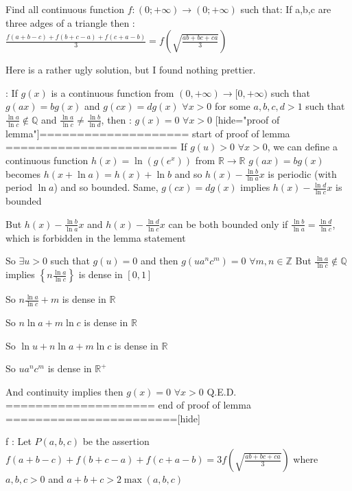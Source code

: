 \begin{solution}
	\begin{tcolorbox}Find all continuous function $f : (0; +\infty) \to  (0; +\infty) $ such that: If a,b,c are three adges of a triangle then : $ \frac{f(a+b-c) + f(b+c-a) + f(c+a-b)}{3} = f(\sqrt{\frac{ab+bc+ca}{3}}) $\end{tcolorbox}
Here is a rather ugly solution, but I found nothing prettier.

: 
If $g(x)$ is a continuous function from $(0,+\infty)\to[0,+\infty)$ such that $g(ax)=bg(x)$ and $g(cx)=dg(x)$ $\forall x>0$ for some $a,b,c,d>1$ such that $\frac{\ln a}{\ln c}\notin \mathbb Q$ and $\frac{\ln a}{\ln c}\ne \frac{\ln b}{\ln d}$, then : $g(x)=0$ $\forall x>0$
[hide="proof of lemma"]==================== start of proof of lemma =======================
If $g(u)>0$ $\forall x>0$, we can define a continuous function $h(x)=\ln(g(e^x))$ from $\mathbb R\to \mathbb R$
$g(ax)=bg(x)$ becomes $h(x+\ln a)=h(x)+\ln b$ and so $h(x)-\frac{\ln b}{\ln a}x$ is periodic (with period $\ln a$) and so bounded.
Same, $g(cx)=dg(x)$ implies $h(x)-\frac{\ln d}{\ln c}x$ is bounded

But $h(x)-\frac{\ln b}{\ln a}x$ and $h(x)-\frac{\ln d}{\ln c}x$ can be both bounded only if $\frac{\ln b}{\ln a}= \frac{\ln d}{\ln c}$, which is forbidden in the lemma statement

So $\exists u>0$ such that $g(u)=0$ and then $g(ua^nc^m)=0$ $\forall m,n\in\mathbb Z$
But $\frac{\ln a}{\ln c}\notin \mathbb Q$ implies $\left\{n\frac{\ln a}{\ln c}\right\}$ is dense in $[0,1]$

So $n\frac{\ln a}{\ln c}+m$ is dense in $\mathbb R$

So $n\ln a+m\ln c$ is dense in $\mathbb R$

So $\ln u+n\ln a+m\ln c$ is dense in $\mathbb R$

So $ua^nc^m$ is dense in $\mathbb R^+$

And continuity implies then $g(x)=0$ $\forall x>0$
Q.E.D.
====================  end of proof of lemma  =======================[\/hide]

f :
Let $P(a,b,c)$ be the assertion $f(a+b-c)+f(b+c-a)+f(c+a-b)=3f(\sqrt{\frac{ab+bc+ca}3})$ where $a,b,c>0$ and $a+b+c>2\max(a,b,c)$


\end{solution}
